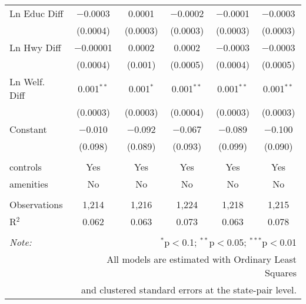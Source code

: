 \begin{table}[!htbp]
\begin{tabular}{@{\extracolsep{5pt}}lccccc}
  Ln Educ Diff & $-$0.0003 & 0.0001 & $-$0.0002 & $-$0.0001 & $-$0.0003 \\ 
  & (0.0004) & (0.0003) & (0.0003) & (0.0003) & (0.0003) \\ 
  Ln Hwy Diff & $-$0.00001 & 0.0002 & 0.0002 & $-$0.0003 & $-$0.0003 \\ 
  & (0.0004) & (0.001) & (0.0005) & (0.0004) & (0.0005) \\ 
  Ln Welf. Diff & 0.001$^{**}$ & 0.001$^{*}$ & 0.001$^{**}$ & 0.001$^{**}$ & 0.001$^{**}$ \\ 
  & (0.0003) & (0.0003) & (0.0004) & (0.0003) & (0.0003) \\ 
  Constant & $-$0.010 & $-$0.092 & $-$0.067 & $-$0.089 & $-$0.100 \\ 
  & (0.098) & (0.089) & (0.093) & (0.099) & (0.090) \\ 
 \hline \\[-1.8ex] 
controls & Yes & Yes & Yes & Yes & Yes \\ 
amenities & No & No & No & No & No \\ 
\hline \\[-1.8ex] 
Observations & 1,214 & 1,216 & 1,224 & 1,218 & 1,215 \\ 
R$^{2}$ & 0.062 & 0.063 & 0.073 & 0.063 & 0.078 \\ 
\hline 
\hline \\[-1.8ex] 
\textit{Note:}  & \multicolumn{5}{r}{$^{*}$p$<$0.1; $^{**}$p$<$0.05; $^{***}$p$<$0.01} \\ 
 & \multicolumn{5}{r}{All models are estimated with Ordinary Least Squares} \\ 
 & \multicolumn{5}{r}{and clustered standard errors at the state-pair level.} \\ 
\end{tabular} 
\end{table} 
